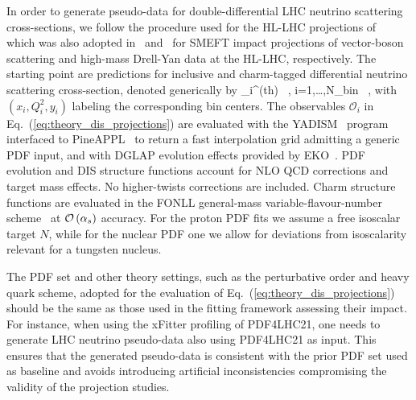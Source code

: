 In order to generate pseudo-data for double-differential
 LHC neutrino scattering cross-sections, we follow the procedure
 used for the HL-LHC projections of~\cite{AbdulKhalek:2018rok} which was
 also adopted in~\cite{Ethier:2021ydt} and~\cite{Greljo:2021kvv} for SMEFT impact projections
 of vector-boson scattering and high-mass Drell-Yan data at the HL-LHC, respectively.
 The starting point are predictions for inclusive and charm-tagged
 differential neutrino scattering cross-section, denoted generically by
 \be
 \label{eq:theory_dis_projections}
 _i^{{\rm (th)}} \equiv {} \, ,\quad
 i=1,\ldots,N_{\rm bin} \, ,
 \ee
 with $(x_i,Q^2_i,y_i)$ labeling the corresponding bin centers.
 The observables $\mathcal{O}_i $ in Eq.~(\ref{eq:theory_dis_projections})
are evaluated with the
{\sc\small YADISM}~\cite{yadism,Candido:2023utz} program
interfaced to {\sc\small PineAPPL}~\cite{Carrazza:2020gss, christopher_schwan_2023_7995675}
to return a fast interpolation grid admitting a generic PDF input,
and with DGLAP evolution effects provided by {\sc\small EKO}~\cite{Candido:2022tld}.
%
PDF evolution and DIS structure functions account for NLO QCD corrections
and target mass effects.
%
No higher-twists corrections are included.
%
Charm structure functions are evaluated in the FONLL general-mass variable-flavour-number
scheme~\cite{Forte:2010ta,Ball:2011mu,Faura:2020oom} at $\mathcal{O}\left( \alpha_s\right)$
accuracy.
%
For the proton PDF fits we assume a free isoscalar target $N$, while
for the nuclear PDF one we allow for deviations from isoscalarity relevant
for a tungsten nucleus.

The PDF set and other theory settings, such as the perturbative
order and heavy quark scheme, adopted for the evaluation of
Eq.~(\ref{eq:theory_dis_projections}) should be the same as those
used in the fitting framework assessing their impact.
%
For instance, when using the {\sc\small xFitter} profiling of PDF4LHC21, one needs
 to generate LHC neutrino pseudo-data also using PDF4LHC21 as input.
This ensures that the generated pseudo-data is consistent with the prior PDF
 set used as baseline and avoids introducing artificial inconsistencies 
 compromising the validity of the projection studies.
 

